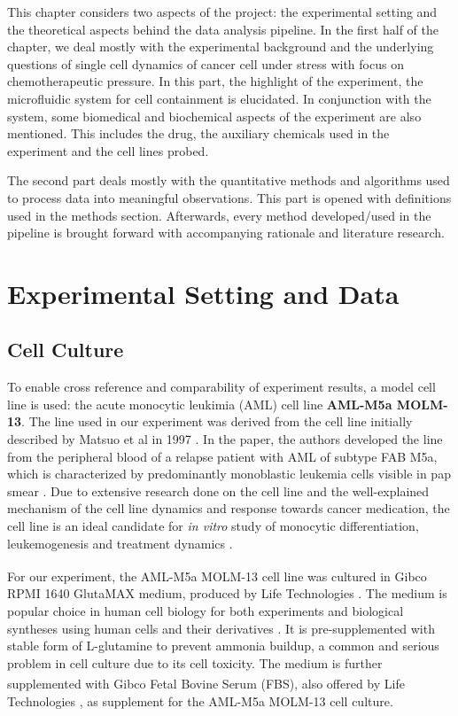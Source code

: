 \documentclass[pdftex,12pt,a4paper]{report}
\begin{document}
This chapter considers two aspects of the project: the experimental setting and the theoretical aspects behind the data analysis pipeline. In the first half of the chapter, we deal mostly with the experimental background and the underlying questions of single cell dynamics of cancer cell under stress with focus on chemotherapeutic pressure. In this part, the highlight of the experiment, the microfluidic system for cell containment is elucidated. In conjunction with the system, some biomedical and biochemical aspects of the experiment are also mentioned. This includes the drug, the auxiliary chemicals used in the experiment and the cell lines probed.

The second part deals mostly with the quantitative methods and algorithms used to process data into meaningful observations. This part is opened with definitions used in the methods section. Afterwards, every method developed/used in the pipeline is brought forward with accompanying rationale and literature research.

\section{Experimental Setting and Data}

\subsection{Cell Culture}
\label{subsection:cell_culture}

To enable cross reference and comparability of experiment results, a model cell line is used: the acute monocytic leukimia (AML) cell line \textbf{AML-M5a MOLM-13}. The line used in our experiment was derived from the cell line initially described by Matsuo et al in 1997 \cite{matsuo1997two}. In the paper, the authors developed the line from the peripheral blood of a relapse patient with AML of subtype FAB M5a, which is characterized by predominantly monoblastic leukemia cells visible in pap smear \cite{arber20162016}. Due to extensive research done on the cell line and the well-explained mechanism of the cell line dynamics and response towards cancer medication, the cell line is an ideal candidate for \textit{in vitro} study of monocytic differentiation, leukemogenesis and treatment dynamics \cite{matsuo1997two, kelly2002ct53518, yokota1997internal}.

For our experiment, the AML-M5a MOLM-13 cell line was cultured in Gibco\textsuperscript{\textregistered} RPMI 1640 GlutaMAX medium, produced by Life Technologies \cite{gibcocellculture2017}. The medium is popular choice in human cell biology for both experiments and biological syntheses using human cells and their derivatives \cite{blight2000efficient, shimizu2002fabrication}. It is pre-supplemented with stable form of L-glutamine to prevent ammonia buildup, a common and serious problem in cell culture due to its cell toxicity\cite{satter1974effect}. The medium is further supplemented with Gibco\textsuperscript{\textregistered} Fetal Bovine Serum (FBS), also offered by Life Technologies \cite{gibcofbs2017}, as supplement for the AML-M5a MOLM-13 cell culture.
\end{document}
